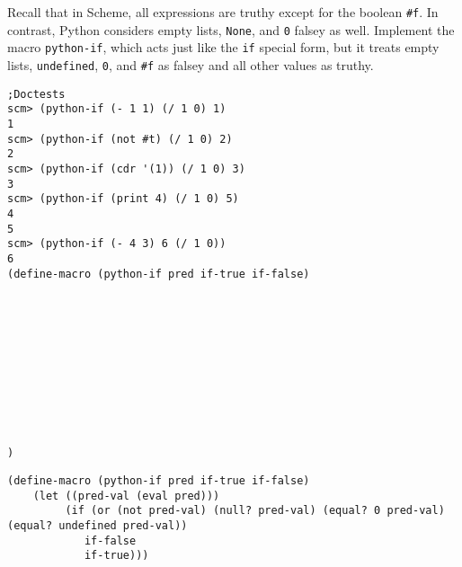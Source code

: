 \begin{blocksection}
\question Recall that in Scheme, all expressions are truthy except for the boolean \lstinline{#f}. In contrast, Python considers empty lists, \lstinline{None}, and \lstinline{0} falsey as well. Implement the macro \lstinline{python-if}, which acts just like the \lstinline{if} special form, but it treats empty lists, \lstinline{undefined}, \lstinline{0}, and \lstinline{#f} as falsey and all other values as truthy. 

\begin{lstlisting}
;Doctests
scm> (python-if (- 1 1) (/ 1 0) 1)
1
scm> (python-if (not #t) (/ 1 0) 2)
2
scm> (python-if (cdr '(1)) (/ 1 0) 3)
3
scm> (python-if (print 4) (/ 1 0) 5)
4
5
scm> (python-if (- 4 3) 6 (/ 1 0))
6
(define-macro (python-if pred if-true if-false)











)
\end{lstlisting}
\end{blocksection}

\begin{solution}
\begin{lstlisting}
(define-macro (python-if pred if-true if-false)
    (let ((pred-val (eval pred)))
         (if (or (not pred-val) (null? pred-val) (equal? 0 pred-val) (equal? undefined pred-val))
            if-false
            if-true)))
\end{lstlisting}
\end{solution}